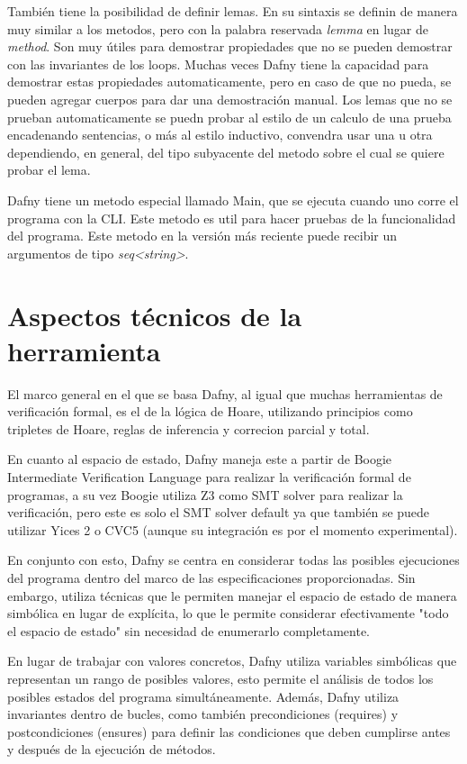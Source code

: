 \documentclass[runningheads]{llncs}
\begin{document}
También tiene la posibilidad de definir lemas. En su sintaxis se definin de manera muy similar a los metodos, pero con la palabra reservada \textit{lemma} en lugar de \textit{method}.
Son muy útiles para demostrar propiedades que no se pueden demostrar con las invariantes de los loops.
Muchas veces Dafny tiene la capacidad para demostrar estas propiedades automaticamente, pero en caso de que no pueda, se pueden agregar cuerpos para dar una demostración manual.
Los lemas que no se prueban automaticamente se puedn probar al estilo de un calculo de una prueba encadenando sentencias, o más al estilo inductivo, convendra usar una u otra dependiendo, en general, del tipo subyacente del metodo sobre el cual se quiere probar el lema.

Dafny tiene un metodo especial llamado Main, que se ejecuta cuando uno corre el programa con la CLI. Este metodo es util para hacer pruebas de la funcionalidad del programa.
Este metodo en la versión más reciente puede recibir un argumentos de tipo \textit{seq<string>}.

\section{Aspectos técnicos de la herramienta}
El marco general en el que se basa Dafny, al igual que muchas herramientas de verificación formal, es el de la lógica de Hoare,
utilizando principios como tripletes de Hoare, reglas de inferencia y correcion parcial y total.

En cuanto al espacio de estado, Dafny maneja este a partir de Boogie Intermediate Verification Language
para realizar la verificación formal de programas, a su vez Boogie utiliza Z3 como SMT solver para realizar la verificación,
pero este es solo el SMT solver default ya que también se puede utilizar Yices 2 o CVC5 (aunque su integración es por el momento experimental).

En conjunto con esto, Dafny se centra en considerar todas las posibles ejecuciones del programa dentro del marco de las especificaciones proporcionadas. 
Sin embargo, utiliza técnicas que le permiten manejar el espacio de estado de manera simbólica en lugar de explícita, 
lo que le permite considerar efectivamente "todo el espacio de estado" sin necesidad de enumerarlo completamente.

En lugar de trabajar con valores concretos, Dafny utiliza variables simbólicas que representan un rango de posibles valores,
esto permite el análisis de todos los posibles estados del programa simultáneamente.
Además, Dafny utiliza invariantes dentro de bucles, como también precondiciones (requires) y postcondiciones (ensures) para definir las condiciones 
que deben cumplirse antes y después de la ejecución de métodos.
\end{document}
